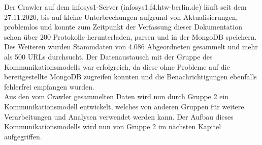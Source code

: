 Der Crawler auf dem infosys1-Server (infosys1.f4.htw-berlin.de) läuft seit dem 27.11.2020, bis auf kleine Unterbrechungen aufgrund von Aktualisierungen, problemlos und konnte zum Zeitpunkt der Verfassung dieser Dokumentation schon über 200 Protokolle herunterladen, parsen und in der MongoDB speichern. Des Weiteren wurden Stammdaten von 4.086 Abgeordneten gesammelt und mehr als 500 URLs durchsucht. Der Datenaustausch mit der Gruppe des Kommunikationsmodells war erfolgreich, da diese ohne Probleme auf die bereitgestellte MongoDB zugreifen konnten und die Benachrichtigungen ebenfalls fehlerfrei empfangen wurden.\\
Aus den vom Crawler gesammelten Daten wird nun durch Gruppe 2 ein Kommunikationsmodell entwickelt, welches von anderen Gruppen für weitere Verarbeitungen und Analysen verwendet werden kann. Der Aufbau dieses Kommunikationsmodells wird nun von Gruppe 2 im nächsten Kapitel aufgegriffen. 